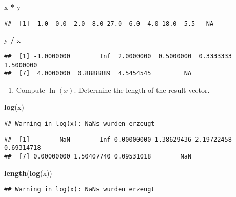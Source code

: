 \documentclass[]{article}
\newenvironment{Shaded}{\begin{snugshade}}{\end{snugshade}}
\newcommand{\KeywordTok}[1]{\textcolor[rgb]{0.13,0.29,0.53}{\textbf{#1}}}
\newcommand{\StringTok}[1]{\textcolor[rgb]{0.31,0.60,0.02}{#1}}
\newcommand{\OperatorTok}[1]{\textcolor[rgb]{0.81,0.36,0.00}{\textbf{#1}}}
\newcommand{\NormalTok}[1]{#1}
\providecommand{\tightlist}{%
  \setlength{\itemsep}{0pt}\setlength{\parskip}{0pt}}
\begin{document}
\begin{Shaded}
\begin{Highlighting}[]
\NormalTok{x }\OperatorTok{*}\StringTok{ }\NormalTok{y}
\end{Highlighting}
\end{Shaded}

\begin{verbatim}
##  [1] -1.0  0.0  2.0  8.0 27.0  6.0  4.0 18.0  5.5   NA
\end{verbatim}

\begin{Shaded}
\begin{Highlighting}[]
\NormalTok{y }\OperatorTok{/}\StringTok{ }\NormalTok{x}
\end{Highlighting}
\end{Shaded}

\begin{verbatim}
##  [1] -1.0000000        Inf  2.0000000  0.5000000  0.3333333  1.5000000
##  [7]  4.0000000  0.8888889  4.5454545         NA
\end{verbatim}

\begin{enumerate}
\def\labelenumi{\arabic{enumi}.}
\setcounter{enumi}{1}
\tightlist
\item
  Compute \(\ln (x)\). Determine the length of the result vector.
\end{enumerate}

\begin{Shaded}
\begin{Highlighting}[]
\KeywordTok{log}\NormalTok{(x)}
\end{Highlighting}
\end{Shaded}

\begin{verbatim}
## Warning in log(x): NaNs wurden erzeugt
\end{verbatim}

\begin{verbatim}
##  [1]        NaN       -Inf 0.00000000 1.38629436 2.19722458 0.69314718
##  [7] 0.00000000 1.50407740 0.09531018        NaN
\end{verbatim}

\begin{Shaded}
\begin{Highlighting}[]
\KeywordTok{length}\NormalTok{(}\KeywordTok{log}\NormalTok{(x))}
\end{Highlighting}
\end{Shaded}

\begin{verbatim}
## Warning in log(x): NaNs wurden erzeugt
\end{verbatim}
\end{document}
